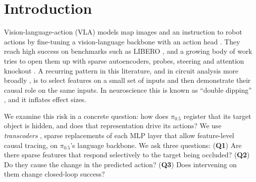 \documentclass{article} %
\newcommand{\pifive}{$\pi_{0.5}$}
\begin{document}
\section{Introduction}
\label{sec:intro}

Vision-language-action (VLA) models map images and an instruction to robot actions by fine-tuning a vision-language backbone with an action head \citep{brohan2023rt2,kim2024openvla,black2024pi0,pi2025pi05}. They reach high success on benchmarks such as LIBERO \citep{liu2023libero}, and a growing body of work tries to open them up with sparse autoencoders, probes, steering and attention knockout \citep{haon2025mechanistic,buurmeijer2026observing,swann2026sparse,grant2026features,jin2026event,shi2026vlatrace}. A recurring pattern in this literature, and in circuit analysis more broadly \citep{marks2025sparse,ameisen2025circuit}, is to select features on a small set of inputs and then demonstrate their causal role on the same inputs. In neuroscience this is known as ``double dipping'' \citep{kriegeskorte2009circular}, and it inflates effect sizes.

We examine this risk in a concrete question: how does \pifive{} \citep{pi2025pi05} register that its target object is hidden, and does that representation drive its actions? We use \emph{transcoders} \citep{dunefsky2024transcoders}, sparse replacements of each MLP layer that allow feature-level causal tracing, on \pifive{}'s language backbone. We ask three questions:
(\textbf{Q1}) Are there sparse features that respond selectively to the target being occluded?
(\textbf{Q2}) Do they cause the change in the predicted action?
(\textbf{Q3}) Does intervening on them change closed-loop success?
\end{document}
